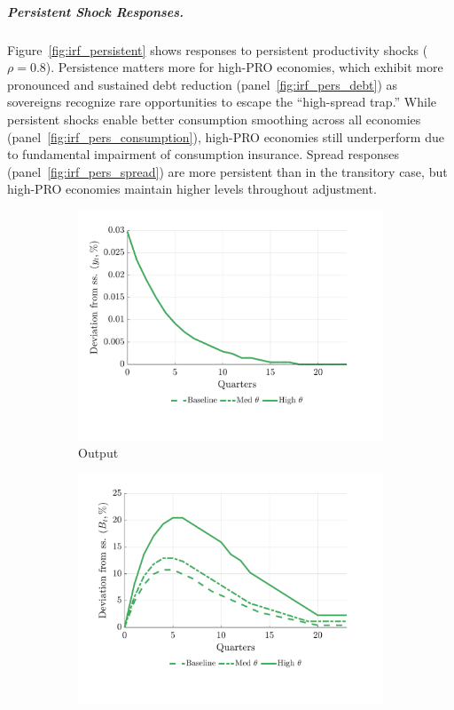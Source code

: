 \documentclass[12pt]{article}
\theoremstyle{plain}
\begin{document}
\subparagraph{Persistent Shock Responses.} Figure~\ref{fig:irf_persistent} shows responses to persistent productivity
shocks ($\rho = 0.8$). Persistence matters more for high-PRO economies, which
exhibit more pronounced and sustained debt reduction
(panel~\ref{fig:irf_pers_debt}) as sovereigns recognize rare opportunities to
escape the ``high-spread trap.'' While persistent shocks enable better
consumption smoothing across all economies
(panel~\ref{fig:irf_pers_consumption}), high-PRO economies still underperform
due to fundamental impairment of consumption insurance. Spread responses
(panel~\ref{fig:irf_pers_spread}) are more persistent than in the transitory
case, but high-PRO economies maintain higher levels throughout adjustment.

\begin{figure}[h]
	\centering
	\begin{subfigure}[b]{0.48\textwidth}
		\centering
		\includegraphics[width=\textwidth]{../../pro-default-model/results/comparison_figure_17.pdf}
		\caption{Output}
		\label{fig:irf_pers_output}
	\end{subfigure}
	\hfill
	\begin{subfigure}[b]{0.48\textwidth}
		\centering
		\includegraphics[width=\textwidth]{../../pro-default-model/results/comparison_figure_18.pdf}

\end{subfigure}
\end{figure}
\end{document}
